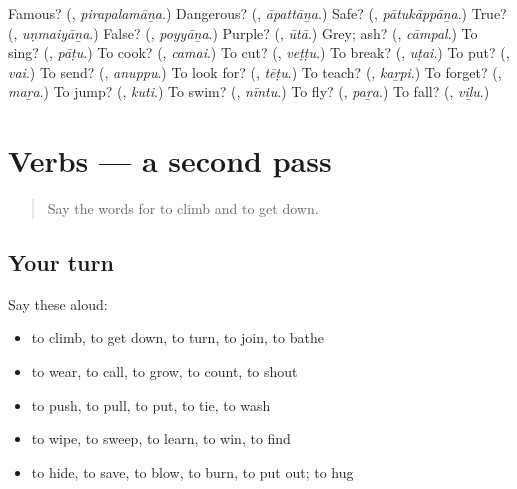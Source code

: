 \begin{tcolorbox}[breakable,colback=teal!4,colframe=teal!35!black,title={Before you move on}]
Famous? (\textbf{}, \emph{pirapalamāṉa}.) Dangerous? (\textbf{}, \emph{āpattāṉa}.) Safe? (\textbf{}, \emph{pātukāppāṉa}.) True? (\textbf{}, \emph{uṇmaiyāṉa}.) False? (\textbf{}, \emph{poyyāṉa}.) Purple? (\textbf{}, \emph{ūtā}.) Grey; ash? (\textbf{}, \emph{cāmpal}.) To sing? (\textbf{}, \emph{pāṭu}.) To cook? (\textbf{}, \emph{camai}.) To cut? (\textbf{}, \emph{veṭṭu}.) To break? (\textbf{}, \emph{uṭai}.) To put? (\textbf{}, \emph{vai}.) To send? (\textbf{}, \emph{anuppu}.) To look for? (\textbf{}, \emph{tēṭu}.) To teach? (\textbf{}, \emph{kaṟpi}.) To forget? (\textbf{}, \emph{maṟa}.) To jump? (\textbf{}, \emph{kuti}.) To swim? (\textbf{}, \emph{nīntu}.) To fly? (\textbf{}, \emph{paṟa}.) To fall? (\textbf{}, \emph{viḻu}.)
\end{tcolorbox}
\section[(dialogue)]{Verbs — a second pass}

\label{lesson:TA-R157-second-pass-verbs}



\begin{quote}
Say the words for to climb and to get down.
\end{quote}

\subsection*{Your turn}
Say these aloud:

\begin{itemize}
\raggedright
  \item to climb, to get down, to turn, to join, to bathe
  \item to wear, to call, to grow, to count, to shout
  \item to push, to pull, to put, to tie, to wash
  \item to wipe, to sweep, to learn, to win, to find
  \item to hide, to save, to blow, to burn, to put out; to hug
\end{itemize}

